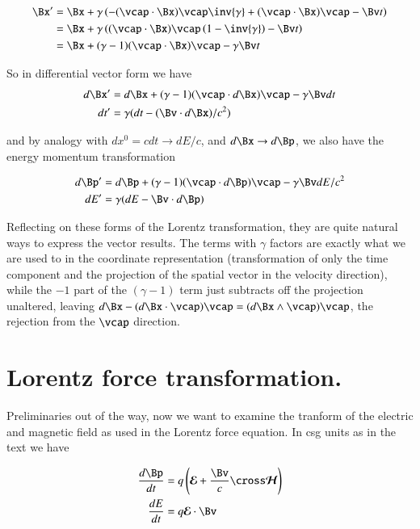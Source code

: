 \documentclass{article}
\newcommand{\EE}[0]{\boldsymbol{\mathcal{E}}}
\newcommand{\HH}[0]{\boldsymbol{\mathcal{H}}}
\begin{document}
\begin{align*}
\Bx' 
&= \Bx + \gamma \left( -(\vcap \cdot \Bx) \vcap \inv{\gamma} + (\vcap \cdot \Bx )\vcap - \Bv t \right) \\
&= \Bx + \gamma \left( (\vcap \cdot \Bx) \vcap \left(1-\inv{\gamma} \right) - \Bv t \right) \\
&= \Bx + (\gamma-1)(\vcap \cdot \Bx) \vcap - \gamma \Bv t \\
\end{align*}

So in differential vector form we have
\begin{align}\label{eqn:differentialSpaceTime}
d\Bx'
&= d\Bx + (\gamma-1)(\vcap \cdot d\Bx) \vcap - \gamma \Bv dt \\
dt' 
&= \gamma ( dt - (\Bv \cdot d\Bx )/c^2 )
\end{align}

and by analogy with $dx^0 = cdt \rightarrow dE/c$, and $d\Bx \rightarrow d\Bp$, we also have the energy momentum transformation 

\begin{align}\label{eqn:differentialEnergyMomentum}
d\Bp'
&= d\Bp + (\gamma-1)(\vcap \cdot d\Bp) \vcap - \gamma \Bv dE/c^2 \\
dE' 
&= \gamma ( dE - \Bv \cdot d\Bp )
\end{align}

Reflecting on these forms of the Lorentz transformation, they are quite
natural ways to express the vector results.  The terms with $\gamma$ factors
are exactly what we are used to in the coordinate representation (transformation
of only the time component and the projection of the spatial vector in the
velocity direction), while the $-1$ part of the $(\gamma-1)$ term just
subtracts off the projection unaltered, leaving
$d\Bx - (d\Bx \cdot \vcap) \vcap = (d\Bx \wedge \vcap) \vcap$, the rejection
from the $\vcap$ direction.

\section{ Lorentz force transformation. }

Preliminaries out of the way, now we want to examine the tranform of the electric and magnetic field as used in the Lorentz force equation.  In
csg units as in the text we have

\begin{align}
\frac{d\Bp}{dt} &= q \left( \EE + \frac{\Bv}{c} \cross \HH \right) \\
\frac{dE}{dt} &= q \EE \cdot \Bv
\end{align}
\end{document}
